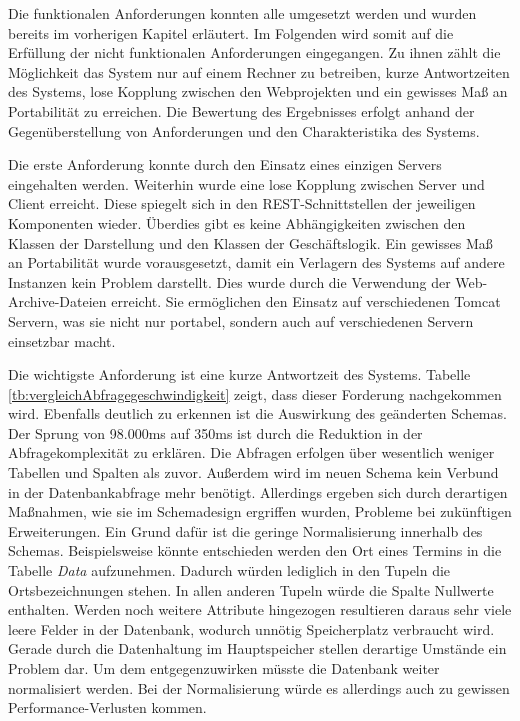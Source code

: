 Die funktionalen Anforderungen konnten alle umgesetzt werden und wurden bereits im vorherigen Kapitel erläutert. Im Folgenden wird somit auf die Erfüllung der nicht funktionalen Anforderungen eingegangen. Zu ihnen zählt die Möglichkeit das System nur auf einem Rechner zu betreiben, kurze Antwortzeiten des Systems, lose Kopplung zwischen den Webprojekten und ein gewisses Maß an Portabilität zu erreichen. Die Bewertung des Ergebnisses erfolgt anhand der Gegenüberstellung von Anforderungen und den Charakteristika des Systems.

Die erste Anforderung konnte durch den Einsatz eines einzigen Servers eingehalten werden. Weiterhin wurde eine lose Kopplung zwischen Server und Client erreicht. Diese spiegelt sich in den REST-Schnittstellen der jeweiligen Komponenten wieder. Überdies gibt es keine Abhängigkeiten zwischen den Klassen der Darstellung und den Klassen der Geschäftslogik. Ein gewisses Maß an Portabilität wurde vorausgesetzt, damit ein Verlagern des Systems auf andere Instanzen kein Problem darstellt. Dies wurde durch die Verwendung der Web-Archive-Dateien erreicht. Sie ermöglichen den Einsatz auf verschiedenen Tomcat Servern, was sie nicht nur portabel, sondern auch auf verschiedenen Servern einsetzbar macht. 

Die wichtigste Anforderung ist eine kurze Antwortzeit des Systems. Tabelle \ref{tb:vergleichAbfragegeschwindigkeit} zeigt, dass dieser Forderung nachgekommen wird. Ebenfalls deutlich zu erkennen ist die Auswirkung des geänderten Schemas. Der Sprung von 98.000ms auf 350ms ist durch die Reduktion in der Abfragekomplexität zu erklären. Die Abfragen erfolgen über wesentlich weniger Tabellen und Spalten als zuvor. Außerdem wird im neuen Schema kein Verbund in der Datenbankabfrage mehr benötigt. Allerdings ergeben sich durch derartigen Maßnahmen, wie sie im Schemadesign ergriffen wurden, Probleme bei zukünftigen Erweiterungen. Ein Grund dafür ist die  geringe Normalisierung innerhalb des Schemas. Beispielsweise könnte  entschieden werden den Ort eines Termins in die Tabelle \textit{Data} aufzunehmen. Dadurch würden lediglich in den Tupeln die Ortsbezeichnungen stehen. In allen anderen Tupeln würde die Spalte Nullwerte enthalten. Werden noch weitere Attribute hingezogen resultieren daraus sehr viele leere Felder in der Datenbank, wodurch unnötig Speicherplatz verbraucht wird. Gerade durch die Datenhaltung im Hauptspeicher stellen derartige Umstände ein Problem dar. Um dem entgegenzuwirken müsste die Datenbank weiter normalisiert werden. Bei der Normalisierung würde es allerdings auch zu gewissen Performance-Verlusten kommen.

